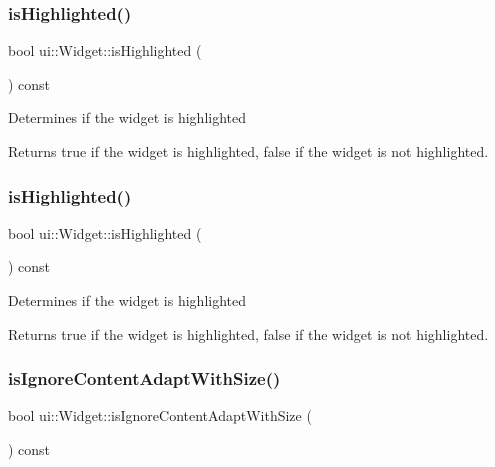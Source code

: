 \subsubsection{\texorpdfstring{is\+Highlighted()}{isHighlighted()}\hspace{0.1cm}{\footnotesize\ttfamily [1/2]}}
{\footnotesize\ttfamily bool ui\+::\+Widget\+::is\+Highlighted (\begin{DoxyParamCaption}{ }\end{DoxyParamCaption}) const}

Determines if the widget is highlighted

\begin{DoxyReturn}{Returns}
true if the widget is highlighted, false if the widget is not highlighted. 
\end{DoxyReturn}
\mbox{\label{classui_1_1Widget_ae95900edba414cdf224bdd528de84091}} 
\subsubsection{\texorpdfstring{is\+Highlighted()}{isHighlighted()}\hspace{0.1cm}{\footnotesize\ttfamily [2/2]}}
{\footnotesize\ttfamily bool ui\+::\+Widget\+::is\+Highlighted (\begin{DoxyParamCaption}{ }\end{DoxyParamCaption}) const}

Determines if the widget is highlighted

\begin{DoxyReturn}{Returns}
true if the widget is highlighted, false if the widget is not highlighted. 
\end{DoxyReturn}
\mbox{\label{classui_1_1Widget_a6d0624feb9ef5cfbafdb71b80473390a}} 
\subsubsection{\texorpdfstring{is\+Ignore\+Content\+Adapt\+With\+Size()}{isIgnoreContentAdaptWithSize()}\hspace{0.1cm}{\footnotesize\ttfamily [1/2]}}
{\footnotesize\ttfamily bool ui\+::\+Widget\+::is\+Ignore\+Content\+Adapt\+With\+Size (\begin{DoxyParamCaption}{ }\end{DoxyParamCaption}) const}

